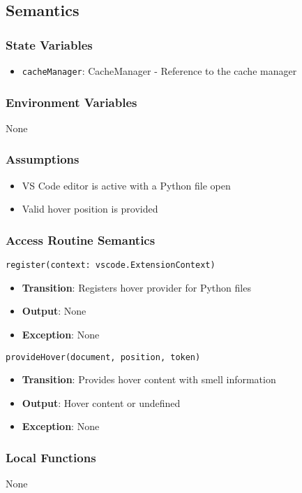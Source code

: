 \documentclass[12pt, titlepage]{article}
\begin{document}
\subsection{Semantics}

\subsubsection{State Variables}
\begin{itemize}
\item \texttt{cacheManager}: CacheManager - Reference to the cache manager
\end{itemize}

\subsubsection{Environment Variables}
None

\subsubsection{Assumptions}
\begin{itemize}
\item VS Code editor is active with a Python file open
\item Valid hover position is provided
\end{itemize}

\subsubsection{Access Routine Semantics}
\texttt{register(context: vscode.ExtensionContext)}
\begin{itemize}
\item \textbf{Transition}: Registers hover provider for Python files
\item \textbf{Output}: None
\item \textbf{Exception}: None
\end{itemize}

\texttt{provideHover(document, position, token)}
\begin{itemize}
\item \textbf{Transition}: Provides hover content with smell information
\item \textbf{Output}: Hover content or undefined
\item \textbf{Exception}: None
\end{itemize}

\subsubsection{Local Functions}
None
\end{document}
